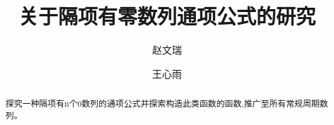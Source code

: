 \documentclass[final,3p,times,onecolumn]{elsarticle}
\begin{document}
\begin{frontmatter}



\title{关于隔项有零数列通项公式的研究}


\author{赵文瑞}

\author{王心雨}

\address{organization={天津市耀华中学},%
            addressline={天津市和平区南京路106号}, 
            city={天津},
            postcode={300000}, 
            state={学生},
            country={中国}}

\begin{abstract}

探究一种隔项有n个0数列的通项公式并探索构造此类函数的函数,推广至所有常规周期数列。

\end{abstract}




\end{frontmatter}
\end{document}
